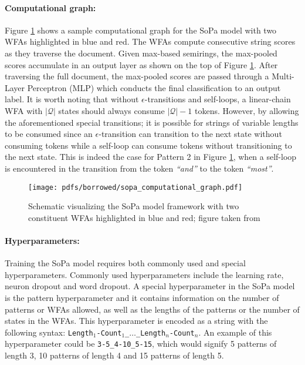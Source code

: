 \paragraph{Computational graph:} Figure \ref{fig:sopa} shows a sample computational graph for the SoPa model with two WFAs highlighted in blue and red. The WFAs compute consecutive string scores as they traverse the document. Given max-based semirings, the max-pooled scores accumulate in an output layer as shown on the top of Figure \ref{fig:sopa}. After traversing the full document, the max-pooled scores are passed through a Multi-Layer Perceptron (MLP) which conducts the final classification to an output label. It is worth noting that without $\epsilon$-transitions and self-loops, a linear-chain WFA with $|\mathcal{Q}|$ states should always consume $\mathcal{|Q|}-1$ tokens. However, by allowing the aforementioned special transitions; it is possible for strings of variable lengths to be consumed since an $\epsilon$-transition can transition to the next state without consuming tokens while a self-loop can consume tokens without transitioning to the next state. This is indeed the case for Pattern 2 in Figure \ref{fig:sopa}, when a self-loop is encountered in the transition from the token \textit{``and''} to the token \textit{``most''}.

\begin{figure}[t]
  \centering
  \texttt{[image: pdfs/borrowed/sopa\_computational\_graph.pdf]}
  \caption{Schematic visualizing the SoPa model framework with two constituent WFAs highlighted in blue and red; figure taken from \citet{schwartz2018sopa}}
  \label{fig:sopa}
\end{figure}

\paragraph{Hyperparameters:} Training the SoPa model requires both commonly used and special hyperparameters. Commonly used hyperparameters include the learning rate, neuron dropout and word dropout. A special hyperparameter in the SoPa model is the pattern hyperparameter and it contains information on the number of patterns or WFAs allowed, as well as the lengths of the patterns or the number of states in the WFAs. This hyperparameter is encoded as a string with the following syntax: \texttt{Length$_{1}$-Count$_{1}$\_$\dots$\_Length$_{n}$-Count$_{n}$}. An example of this hyperparameter could be \texttt{3-5\_4-10\_5-15}, which would signify 5 patterns of length 3, 10 patterns of length 4 and 15 patterns of length 5.

